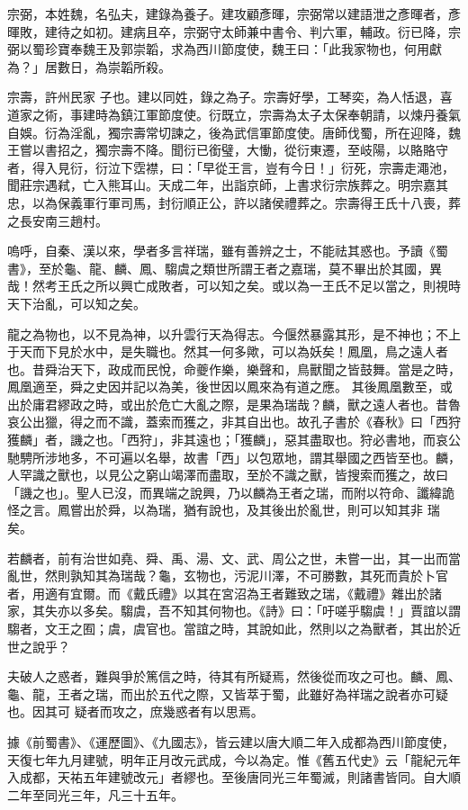 \begin{pinyinscope}
 宗弼，本姓魏，名弘夫，建錄為養子。建攻顧彥暉，宗弼常以建語泄之彥暉者，彥暉敗，建待之如初。建病且卒，宗弼守太師兼中書令、判六軍，輔政。衍已降，宗弼以蜀珍寶奉魏王及郭崇韜，求為西川節度使，魏王曰：「此我家物也，何用獻為？」居數日，為崇韜所殺。



 宗壽，許州民家
 子也。建以同姓，錄之為子。宗壽好學，工琴奕，為人恬退，喜道家之術，事建時為鎮江軍節度使。衍既立，宗壽為太子太保奉朝請，以煉丹養氣自娛。衍為淫亂，獨宗壽常切諫之，後為武信軍節度使。唐師伐蜀，所在迎降，魏王嘗以書招之，獨宗壽不降。聞衍已銜璧，大慟，從衍東遷，至岐陽，以賂賂守者，得入見衍，衍泣下霑襟，曰：「早從王言，豈有今日！」衍死，宗壽走澠池，聞莊宗遇弒，亡入熊耳山。天成二年，出詣京師，上書求衍宗族葬之。明宗嘉其忠，以為保義軍行軍司馬，封衍順正公，許以諸侯禮葬之。宗壽得王氏十八喪，葬之長安南三趙村。



 嗚呼，自秦、漢以來，學者多言祥瑞，雖有善辨之士，不能祛其惑也。予讀《蜀書》，至於龜、龍、麟、鳳、騶虞之類世所謂王者之嘉瑞，莫不畢出於其國，異哉！然考王氏之所以興亡成敗者，可以知之矣。或以為一王氏不足以當之，則視時天下治亂，可以知之矣。



 龍之為物也，以不見為神，以升雲行天為得志。今偃然暴露其形，是不神也；不上于天而下見於水中，是失職也。然其一何多歟，可以為妖矣！鳳凰，鳥之遠人者也。昔舜治天下，政成而民悅，命夔作樂，樂聲和，鳥獸聞之皆鼓舞。當是之時，鳳凰適至，舜之史因并記以為美，後世因以鳳來為有道之應。
 其後鳳凰數至，或出於庸君繆政之時，或出於危亡大亂之際，是果為瑞哉？麟，獸之遠人者也。昔魯哀公出獵，得之而不識，蓋索而獲之，非其自出也。故孔子書於《春秋》曰「西狩獲麟」者，譏之也。「西狩」，非其遠也；「獲麟」，惡其盡取也。狩必書地，而哀公馳騁所涉地多，不可遍以名舉，故書「西」以包眾地，謂其舉國之西皆至也。麟，人罕識之獸也，以見公之窮山竭澤而盡取，至於不識之獸，皆搜索而獲之，故曰「譏之也」。聖人已沒，而異端之說興，乃以麟為王者之瑞，而附以符命、讖緯詭怪之言。鳳嘗出於舜，以為瑞，猶有說也，及其後出於亂世，則可以知其非
 瑞矣。



 若麟者，前有治世如堯、舜、禹、湯、文、武、周公之世，未嘗一出，其一出而當亂世，然則孰知其為瑞哉？龜，玄物也，污泥川澤，不可勝數，其死而貴於卜官者，用適有宜爾。而《戴氏禮》以其在宮沼為王者難致之瑞，《戴禮》雜出於諸家，其失亦以多矣。騶虞，吾不知其何物也。《詩》曰：「吁嗟乎騶虞！」賈誼以謂騶者，文王之囿；虞，虞官也。當誼之時，其說如此，然則以之為獸者，其出於近世之說乎？



 夫破人之惑者，難與爭於篤信之時，待其有所疑焉，然後從而攻之可也。麟、鳳、龜、龍，王者之瑞，而出於五代之際，又皆萃于蜀，此雖好為祥瑞之說者亦可疑也。因其可
 疑者而攻之，庶幾惑者有以思焉。



 據《前蜀書》、《運歷圖》、《九國志》，皆云建以唐大順二年入成都為西川節度使，天復七年九月建號，明年正月改元武成，今以為定。惟《舊五代史》云「龍紀元年入成都，天祐五年建號改元」者繆也。至後唐同光三年蜀滅，則諸書皆同。自大順二年至同光三年，凡三十五年。



\end{pinyinscope}
